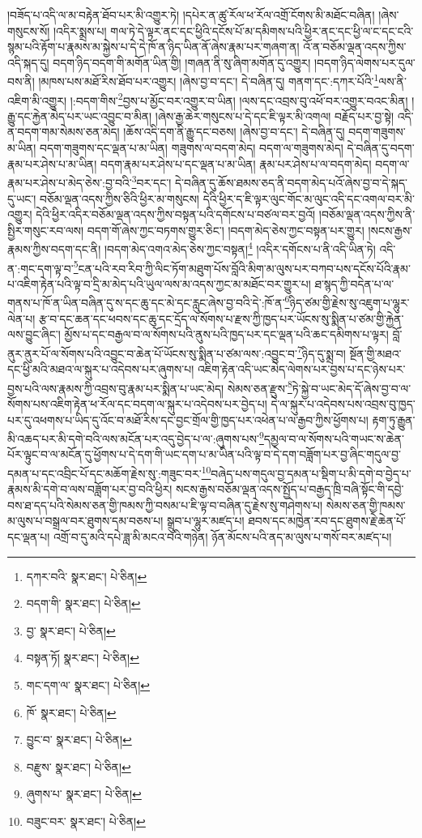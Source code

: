 །བཟོད་པ་འདི་ལ་མ་བརྟེན་ཐོབ་པར་མི་འགྱུར་ཏེ། །དཔེར་ན་ཚུ་རོལ་ཕ་རོལ་འགྲོ་ངོགས་མི་མཐོང་བཞིན། །ཞེས་གསུངས་སོ། །འདིར་སྨྲས་པ། གལ་ཏེ་དེ་ལྟར་ནང་དང་ཕྱིའི་དངོས་པོ་མ་དམིགས་པའི་ཕྱིར་ནང་དང་ཕྱི་ལ་ང་དང་ངའི་སྙམ་པའི་རྟོག་པ་རྣམས་མ་སྐྱེས་པ་དེ་དེ་ཁོ་ན་ཉིད་ཡིན་ནོ་ཞེས་རྣམ་པར་གཞག་ན། འོ་ན་བཅོམ་ལྡན་འདས་ཀྱིས་འདི་སྐད་དུ། བདག་ཉིད་བདག་གི་མགོན་ཡིན་གྱི། །གཞན་ནི་སུ་ཞིག་མགོན་དུ་འགྱུར། །བདག་ཉིད་ལེགས་པར་དུལ་བས་ནི། །མཁས་པས་མཐོ་རིས་ཐོབ་པར་འགྱུར། །ཞེས་བྱ་བ་དང་། དེ་བཞིན་དུ། གནག་དང་:དཀར་པོའི་\footnote{དཀར་བའི་  སྣར་ཐང་།  པེ་ཅིན། }ལས་ནི་འཇིག་མི་འགྱུར། །:བདག་གིས་\footnote{བདག་གི་  སྣར་ཐང་།  པེ་ཅིན། }བྱས་པ་མྱོང་བར་འགྱུར་བ་ཡིན། །ལས་དང་འབྲས་བུ་འཕོ་བར་འགྱུར་བའང་མིན། །རྒྱུ་དང་རྐྱེན་མེད་པར་ཡང་འབྱུང་བ་མིན། །ཞེས་རྒྱ་ཆེར་གསུངས་པ་དེ་དང་ཇི་ལྟར་མི་འགལ། བརྗོད་པར་བྱ་སྟེ། འདི་ན་བདག་གམ་སེམས་ཅན་མེད། །ཆོས་འདི་དག་ནི་རྒྱུ་དང་བཅས། །ཞེས་བྱ་བ་དང་། དེ་བཞིན་དུ། བདག་གཟུགས་མ་ཡིན། བདག་གཟུགས་དང་ལྡན་པ་མ་ཡིན། གཟུགས་ལ་བདག་མེད། བདག་ལ་གཟུགས་མེད། དེ་བཞིན་དུ་བདག་རྣམ་པར་ཤེས་པ་མ་ཡིན། བདག་རྣམ་པར་ཤེས་པ་དང་ལྡན་པ་མ་ཡིན། རྣམ་པར་ཤེས་པ་ལ་བདག་མེད། བདག་ལ་རྣམ་པར་ཤེས་པ་མེད་ཅེས་:བྱ་བའི་\footnote{བྱ་  སྣར་ཐང་།  པེ་ཅིན། }བར་དང་། དེ་བཞིན་དུ་ཆོས་ཐམས་ཅད་ནི་བདག་མེད་པའོ་ཞེས་བྱ་བ་དེ་སྐད་དུ་ཡང་། བཅོམ་ལྡན་འདས་ཀྱིས་ཅིའི་ཕྱིར་མ་གསུངས། དེའི་ཕྱིར་ད་ཇི་ལྟར་ལུང་གོང་མ་ལུང་འདི་དང་འགལ་བར་མི་འགྱུར། དེའི་ཕྱིར་འདིར་བཅོམ་ལྡན་འདས་ཀྱིས་བསྟན་པའི་དགོངས་པ་བཙལ་བར་བྱའོ། །བཅོམ་ལྡན་འདས་ཀྱིས་ནི་སྤྱིར་གསུང་རབ་ལས། བདག་གོ་ཞེས་ཀྱང་བཏགས་གྱུར་ཅིང་། །བདག་མེད་ཅེས་ཀྱང་བསྟན་པར་གྱུར། །སངས་རྒྱས་རྣམས་ཀྱིས་བདག་དང་ནི། །བདག་མེད་འགའ་མེད་ཅེས་ཀྱང་བསྟན།\footnote{བསྟན་ཏོ།  སྣར་ཐང་།  པེ་ཅིན། } །འདིར་དགོངས་པ་ནི་འདི་ཡིན་ཏེ། འདི་ན་:གང་དག་ལྟ་བ་\footnote{གང་དག་ལ་  སྣར་ཐང་།  པེ་ཅིན། }ངན་པའི་རབ་རིབ་ཀྱི་ལིང་ཏོག་མཐུག་པོས་བློའི་མིག་མ་ལུས་པར་བཀབ་པས་དངོས་པོའི་རྣམ་པ་འཇིག་རྟེན་པའི་ལྟ་བ་དྲི་མ་མེད་པའི་ཡུལ་ལས་མ་འདས་ཀྱང་མ་མཐོང་བར་གྱུར་པ། ཐ་སྙད་ཀྱི་བདེན་པ་ལ་གནས་པ་ཁོ་ན་ཡིན་བཞིན་དུ་ས་དང་ཆུ་དང་མེ་དང་རླུང་ཞེས་བྱ་བའི་དེ་:ཁོ་ན་\footnote{ཁོ་  སྣར་ཐང་།  པེ་ཅིན། }ཉིད་ཙམ་གྱི་རྗེས་སུ་འཇུག་པ་ལྷུར་ལེན་པ། རྩ་བ་དང་ཆན་དང་ཕབས་དང་ཆུ་དང་དྲོད་ལ་སོགས་པ་རྫས་ཀྱི་ཁྱད་པར་ཡོངས་སུ་སྨིན་པ་ཙམ་གྱི་རྐྱེན་ལས་བྱུང་ཞིང་། མྱོས་པ་དང་བརྒྱལ་བ་ལ་སོགས་པའི་ནུས་པའི་ཁྱད་པར་དང་ལྡན་པའི་ཆང་དམིགས་པ་ལྟར། བློ་ནུར་ནུར་པོ་ལ་སོགས་པའི་འབྱུང་བ་ཆེན་པོ་ཡོངས་སུ་སྨིན་པ་ཙམ་ལས་:འབྱུང་བ་\footnote{བྱུང་བ་  སྣར་ཐང་།  པེ་ཅིན། }ཉིད་དུ་སྨྲ་བ། སྔོན་གྱི་མཐའ་དང་ཕྱི་མའི་མཐའ་ལ་སྐུར་པ་འདེབས་པར་ཞུགས་པ། འཇིག་རྟེན་འདི་ཡང་མེད་ལེགས་པར་བྱས་པ་དང་ཉེས་པར་བྱས་པའི་ལས་རྣམས་ཀྱི་འབྲས་བུ་རྣམ་པར་སྨིན་པ་ཡང་མེད། སེམས་ཅན་རྫུས་\footnote{བརྫུས་  སྣར་ཐང་།  པེ་ཅིན། }ཏེ་སྐྱེ་བ་ཡང་མེད་དོ་ཞེས་བྱ་བ་ལ་སོགས་པས་འཇིག་རྟེན་ཕ་རོལ་དང་བདག་ལ་སྐུར་པ་འདེབས་པར་བྱེད་པ། དེ་ལ་སྐུར་པ་འདེབས་པས་འབྲས་བུ་ཁྱད་པར་དུ་འཕགས་པ་ཡིད་དུ་འོང་བ་མཐོ་རིས་དང་བྱང་གྲོལ་གྱི་ཁྱད་པར་འཕེན་པ་ལ་རྒྱབ་ཀྱིས་ཕྱོགས་པ། རྟག་ཏུ་རྒྱུན་མི་འཆད་པར་མི་དགེ་བའི་ལས་མངོན་པར་འདུ་བྱེད་པ་ལ་:ཞུགས་པས་\footnote{ཞུགས་པ་  སྣར་ཐང་།  པེ་ཅིན། }དམྱལ་བ་ལ་སོགས་པའི་གཡང་ས་ཆེན་པོར་ལྟུང་བ་ལ་མངོན་དུ་ཕྱོགས་པ་དེ་དག་གི་ཡང་དག་པ་མ་ཡིན་པའི་ལྟ་བ་དེ་དག་བཟློག་པར་བྱ་ཞིང་གདུལ་བྱ་དམན་པ་དང་འབྲིང་པོ་དང་མཆོག་རྗེས་སུ་:གཟུང་བར་\footnote{བཟུང་བར་  སྣར་ཐང་།  པེ་ཅིན། }བཞེད་པས་གདུལ་བྱ་དམན་པ་སྡིག་པ་མི་དགེ་བ་བྱེད་པ་རྣམས་མི་དགེ་བ་ལས་བཟློག་པར་བྱ་བའི་ཕྱིར། སངས་རྒྱས་བཅོམ་ལྡན་འདས་སྤྱོད་པ་བརྒྱད་ཁྲི་བཞི་སྟོང་གི་དབྱེ་བས་ཐ་དད་པའི་སེམས་ཅན་གྱི་ཁམས་ཀྱི་བསམ་པ་ཇི་ལྟ་བ་བཞིན་དུ་རྗེས་སུ་གཤེགས་པ། སེམས་ཅན་གྱི་ཁམས་མ་ལུས་པ་བསྒྲལ་བར་ཐུགས་དམ་བཅས་པ། སྒྲུབ་པ་ལྷུར་མཛད་པ། ཐབས་དང་མཁྱེན་རབ་དང་ཐུགས་རྗེ་ཆེན་པོ་དང་ལྡན་པ། འགྲོ་བ་དུ་མའི་དཔེ་ཟླ་མི་མངའ་བའི་གཉེན། ཉོན་མོངས་པའི་ནད་མ་ལུས་པ་གསོ་བར་མཛད་པ། 